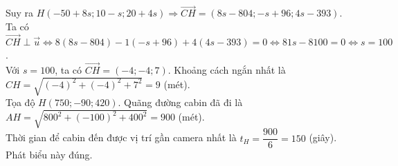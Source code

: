 \begin{ex}
{\begin{itemchoice}
			Suy ra $H(-50+8s; 10-s; 20+4s) \Rightarrow \overrightarrow{CH} = (8s - 804; -s + 96; 4s - 393)$.\\
			Ta có $\overrightarrow{CH} \perp \overrightarrow{u} \Leftrightarrow 8(8s - 804) - 1(-s + 96) + 4(4s - 393) = 0 \Leftrightarrow 81s - 8100 = 0 \Leftrightarrow s = 100$.\\
			Với $s=100$, ta có $\overrightarrow{CH} = (-4; -4; 7)$. Khoảng cách ngắn nhất là $CH = \sqrt{(-4)^2 + (-4)^2 + 7^2} = 9$ (mét).\\
			Tọa độ $H(750; -90; 420)$. Quãng đường cabin đã đi là $AH = \sqrt{800^2 + (-100)^2 + 400^2} = 900$ (mét).\\
			Thời gian để cabin đến được vị trí gần camera nhất là $t_H = \dfrac{900}{6} = 150$ (giây). Phát biểu này đúng.
		\end{itemchoice}
	}
\end{ex}

